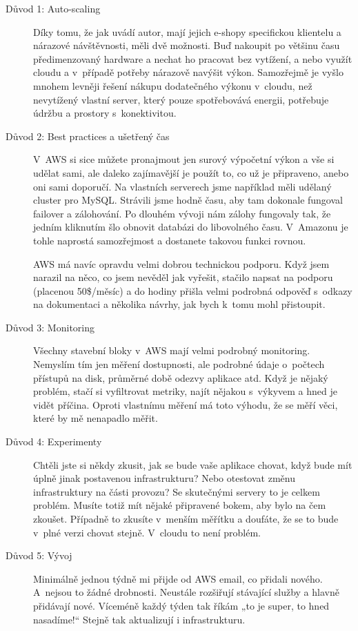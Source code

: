 \begin{description}
	\item [Důvod 1: Auto-scaling] Díky tomu, že jak uvádí autor, mají jejich e-shopy specifickou klientelu a nárazové návštěvnosti, měli dvě možnosti. Buď nakoupit po většinu času předimenzovaný hardware a nechat ho pracovat bez vytížení, a nebo využít cloudu a v~případě potřeby nárazově navýšit výkon. Samozřejmě je vyšlo mnohem levněji řešení nákupu dodatečného výkonu v~cloudu, než nevytížený vlastní server, který pouze spotřebovává energii, potřebuje údržbu a prostory s~konektivitou.
	\item [Důvod 2: Best practices a ušetřený čas] V~AWS si sice můžete pronajmout jen surový výpočetní výkon a vše si udělat sami, ale daleko zajímavější je použít to, co už je připraveno, anebo oni sami doporučí. Na vlastních serverech jsme například měli udělaný cluster pro MySQL. Strávili jsme hodně času, aby tam dokonale fungoval failover a zálohování. Po dlouhém vývoji nám zálohy fungovaly tak, že jedním kliknutím šlo obnovit databázi do libovolného času. V~Amazonu je tohle naprostá samozřejmost a dostanete takovou funkci rovnou.

AWS má navíc opravdu velmi dobrou technickou podporu. Když jsem narazil na něco, co jsem nevěděl jak vyřešit, stačilo napsat na podporu (placenou 50\$/měsíc) a do hodiny přišla velmi podrobná odpověď s~odkazy na dokumentaci a několika návrhy, jak bych k~tomu mohl přistoupit.\cite{souki:procMigrovat}
	\item [Důvod 3: Monitoring] Všechny stavební bloky v~AWS mají velmi podrobný monitoring. Nemyslím tím jen měření dostupnosti, ale podrobné údaje o~počtech přístupů na disk, průměrné době odezvy aplikace atd. Když je nějaký problém, stačí si vyfiltrovat metriky, najít nějakou s~výkyvem a hned je vidět příčina. Oproti vlastnímu měření má toto výhodu, že se měří věci, které by mě nenapadlo měřit.\cite{souki:procMigrovat}
	\item [Důvod 4: Experimenty] Chtěli jste si někdy zkusit, jak se bude vaše aplikace chovat, když bude mít úplně jinak postavenou infrastrukturu? Nebo otestovat změnu infrastruktury na části provozu? Se skutečnými servery to je celkem problém. Musíte totiž mít nějaké připravené bokem, aby bylo na čem zkoušet. Případně to zkusíte v~menším měřítku a doufáte, že se to bude v~plné verzi chovat stejně. V~cloudu to není problém.\cite{souki:procMigrovat}
	\item [Důvod 5: Vývoj] Minimálně jednou týdně mi přijde od AWS email, co přidali nového. A~nejsou to žádné drobnosti. Neustále rozšiřují stávající služby a hlavně přidávají nové. Víceméně každý týden tak říkám „to je super, to hned nasadíme!“ Stejně tak aktualizují i infrastrukturu.\cite{souki:procMigrovat}
\end{description}
